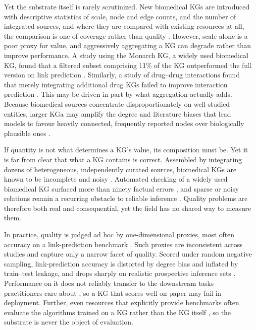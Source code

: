 Yet the substrate itself is rarely scrutinized. New biomedical KGs are introduced with descriptive statistics of scale, node and edge counts, and the number of integrated sources, and where they are compared with existing resources at all, the comparison is one of coverage rather than quality \cite{himmelstein2017,chandak2023}. However, scale alone is a poor proxy for value, and aggressively aggregating a KG can degrade rather than improve performance. A study using the Monarch KG, a widely used biomedical KG, found that a filtered subset comprising 11\% of the KG outperformed the full version on link prediction \cite{bradshaw2024}. Similarly, a study of drug--drug interactions found that merely integrating additional drug KGs failed to improve interaction prediction \cite{celebi2019}. This may be driven in part by what aggregation actually adds. Because biomedical sources concentrate disproportionately on well-studied entities, larger KGa may amplify the degree and literature biases that lead models to favour heavily connected, frequently reported nodes over biologically plausible ones \cite{maclean2021}.

If quantity is not what determines a KG's value, its composition must be. Yet it is far from clear that what a KG contains is correct. Assembled by integrating dozens of heterogeneous, independently curated sources, biomedical KGs are known to be incomplete and noisy \cite{maclean2021,rossi2021}. Automated checking of a widely used biomedical KG surfaced more than ninety factual errors \cite{lin2024}, and sparse or noisy relations remain a recurring obstacle to reliable inference \cite{pujara2017,ma2024}. Quality problems are therefore both real and consequential, yet the field has no shared way to measure them.

In practice, quality is judged ad hoc by one-dimensional proxies, most often accuracy on a link-prediction benchmark \cite{alshahrani2021,chang2020}. Such proxies are inconsistent across studies and capture only a narrow facet of quality. Scored under random negative sampling, link-prediction accuracy is distorted by degree bias \cite{kotnis2017,libennowell2007} and inflated by train--test leakage, and drops sharply on realistic prospective inference sets \cite{briere2025}. Performance on it does not reliably transfer to the downstream tasks practitioners care about \cite{gema2024}, so a KG that scores well on paper may fail in deployment. Further, even resources that explicitly provide benchmarks often evaluate the algorithms trained on a KG rather than the KG itself \cite{breit2020,walsh2020}, so the substrate is never the object of evaluation.

